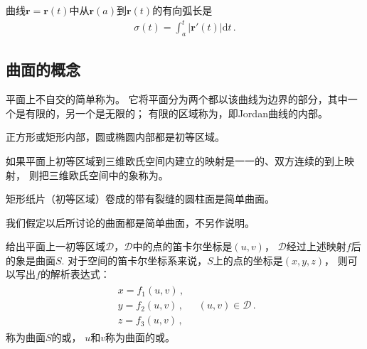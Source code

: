 \begin{corollary}
    曲线$\bm r=\bm r(t)$中从$\bm r(a)$到$\bm r(t)$的有向弧长是
    \begin{align}\label{eq:03ex01.8}
        \sigma(t)=\int_a^t{|\bm r'(t)|\mathrm{d}t}\, .
    \end{align}
\end{corollary}

\subsection{曲面的概念}\label{sub:曲面的概念}
\begin{definition}
    平面上不自交的简单称为。
    它将平面分为两个都以该曲线为边界的部分，其中一个是有限的，另一个是无限的；
    有限的区域称为，即Jordan曲线的内部。
\end{definition}
\begin{example}
    正方形或矩形内部，圆或椭圆内部都是初等区域。
\end{example}

\begin{definition}
    如果平面上初等区域到三维欧氏空间内建立的映射是一一的、双方连续的到上映射，
    则把三维欧氏空间中的象称为。
\end{definition}
\begin{example}
    矩形纸片（初等区域）卷成的带有裂缝的圆柱面是简单曲面。
\end{example}

我们假定以后所讨论的曲面都是简单曲面，不另作说明。

给出平面上一初等区域$\mathscr{D}$，$\mathscr{D}$中的点的笛卡尔坐标是$(u,v)$，
$\mathscr{D}$经过上述映射$f$后的象是曲面$S$.
对于空间的笛卡尔坐标系来说，$S$上的点的坐标是$(x,y,z)$，
则可以写出$f$的解析表达式：
\begin{align}\label{eq:03ex01.9}
    \begin{array}{l}
        x=f_1(u,v)\, , \\
        y=f_2(u,v)\, , \\
        z=f_3(u,v)\, ,
    \end{array}\quad (u,v)\in \mathscr{D}\, .
\end{align}
称为曲面$S$的或，
$u$和$v$称为曲面的或。

